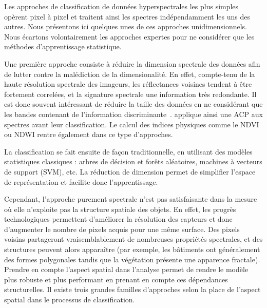 Les approches de classification de données hyperspectrales les plus simples opèrent pixel à pixel et traitent ainsi les spectres indépendamment les uns des autres. Nous présentons ici quelques unes de ces approches unidimensionnels. Nous écartons volontairement les approches expertes pour ne considérer que les méthodes d'apprentissage statistique.

Une première approche consiste à réduire la dimension spectrale des données afin de lutter contre la malédiction de la dimensionalité. En effet, compte-tenu de la haute résolution spectrale des imageurs, les réflectances voisines tendent à être fortement correlées, et la signature spectrale une information très redondante. Il est donc souvent intéressant de réduire la taille des données en ne considérant que les bandes contenant de l'information discriminante~\cite{le_bris_extraction_2015,bevilacqua_unsupervised_2017}. \citet{rodarmel_principal_2002} applique ainsi une \gls{ACP} aux spectres avant leur classification. Le calcul des indices physiques comme le \gls{NDVI} ou \gls{NDWI} rentre également dans ce type d'approches.

La classification se fait ensuite de façon traditionnelle, en utilisant des modèles statistiques classiques : arbres de décision et forêts aléatoires, machines à vecteurs de support (SVM), etc. La réduction de dimension permet de simplifier l'espace de représentation et facilite donc l'apprentissage.

Cependant, l'approche purement spectrale n'est pas satisfaisante dans la mesure où elle n'exploite pas la structure spatiale des objets. En effet, les progrès technologiques permettent d'améliorer la résolution des capteurs et donc d'augmenter le nombre de pixels acquis pour une même surface. Des pixels voisins partageront vraisemblablement de nombreuses propriétés spectrales, et des structures peuvent alors apparaître (par exemple, les bâtiments ont généralement des formes polygonales tandis que la végétation présente une apparence fractale). Prendre en compte l'aspect spatial dans l'analyse permet de rendre le modèle plus robuste et plus performant en prenant en compte ces dépendances structurelles. Il existe trois grandes familles d'approches selon la place de l'aspect spatial dans le processus de classification.

